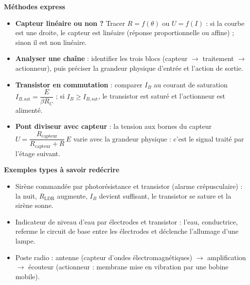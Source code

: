 \documentclass[11pt]{article}
\begin{document}
\begin{aretenir}
\textbf{Méthodes express}
\begin{itemize}
  \item \textbf{Capteur linéaire ou non ?} Tracer $R=f(\theta)$ ou $U=f(I)$ : si la courbe est une droite, le capteur est linéaire (réponse proportionnelle ou affine) ; sinon il est non linéaire.
  \item \textbf{Analyser une chaîne} : identifier les trois blocs (capteur $\rightarrow$ traitement $\rightarrow$ actionneur), puis préciser la grandeur physique d'entrée et l'action de sortie.
  \item \textbf{Transistor en commutation} : comparer $I_B$ au courant de saturation $I_{B,\mathrm{sat}} = \dfrac{E}{\beta R_C}$ ; si $I_B \geq I_{B,\mathrm{sat}}$, le transistor est saturé et l'actionneur est alimenté.
  \item \textbf{Pont diviseur avec capteur} : la tension aux bornes du capteur $U = \dfrac{R_{\text{capteur}}}{R_{\text{capteur}}+R}\,E$ varie avec la grandeur physique : c'est le signal traité par l'étage suivant.
\end{itemize}

\textbf{Exemples types à savoir redécrire}
\begin{itemize}
  \item Sirène commandée par photorésistance et transistor (alarme crépusculaire) : la nuit, $R_{\text{LDR}}$ augmente, $I_B$ devient suffisant, le transistor se sature et la sirène sonne.
  \item Indicateur de niveau d'eau par électrodes et transistor : l'eau, conductrice, referme le circuit de base entre les électrodes et déclenche l'allumage d'une lampe.
  \item Poste radio : antenne (capteur d'ondes électromagnétiques) $\rightarrow$ amplification $\rightarrow$ écouteur (actionneur : membrane mise en vibration par une bobine mobile).
\end{itemize}
\end{aretenir}
\end{document}
